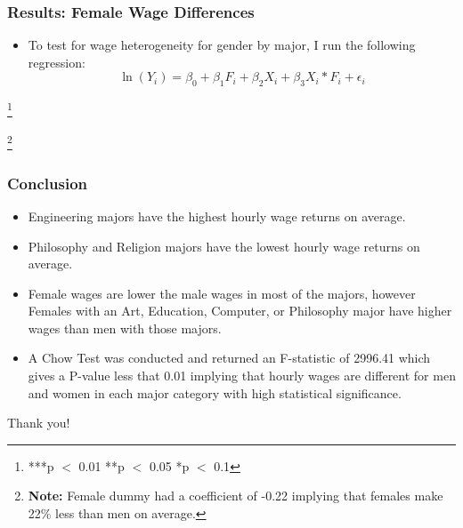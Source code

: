 \documentclass[12pt]{beamer}
\newcommand\blfootnote[1]{%
  \begingroup
  \renewcommand\thefootnote{}\footnote{#1}%
  \addtocounter{footnote}{-1}%
  \endgroup
}
\begin{document}
\begin{frame}
\frametitle{Results: Female Wage Differences}
\begin{itemize}
\item To test for wage heterogeneity for gender by major, I run the following regression:
\begin{equation}
\ln(Y_i) = \beta_0 + \beta_1F_i + \beta_2X_i + \beta_3X_i*F_i + \epsilon_i
\end{equation}
\end{itemize}
\begin{table}
\begin{footnotesize}
\blfootnote{***p $<$ 0.01 **p $<$ 0.05 *p $<$ 0.1}
\blfootnote{\textbf{Note:} Female dummy had a coefficient of -0.22 implying that females make 22\% less than men on average.}
\end{footnotesize}

\end{table}
\end{frame}

\begin{frame}
\frametitle{Conclusion}
\begin{itemize}
\item Engineering majors have the highest hourly wage returns on average.
\item Philosophy and Religion majors have the lowest hourly wage returns on average.
\item Female wages are lower the male wages in most of the majors, however Females with an Art, Education, Computer, or Philosophy major have higher wages than men with those majors.
\item A Chow Test was conducted and returned an F-statistic of 2996.41 which gives a P-value less that 0.01 implying that hourly wages are different for men and women in each major category with high statistical significance. 
\end{itemize}
\end{frame}
\begin{frame}
\begin{center}
\huge Thank you!
\end{center}
\end{frame}
\end{document}
